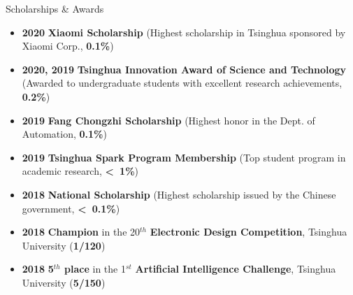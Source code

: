 \documentclass{resume} %
\begin{document}
\begin{rSection}{Scholarships \& Awards}
\begin{spacing}{1.05}
\begin{itemize}
    \item \textbf{2020} \textbf{Xiaomi Scholarship} (Highest scholarship in Tsinghua sponsored by Xiaomi Corp., \textbf{0.1\%})
    \item \textbf{2020, 2019} \textbf{Tsinghua Innovation Award of Science and Technology} (Awarded to undergraduate students with excellent research achievements, \textbf{0.2\%})
    \item \textbf{2019} \textbf{Fang Chongzhi Scholarship} (Highest honor in the Dept. of Automation, \textbf{0.1\%})
    \item \textbf{2019} \textbf{Tsinghua Spark Program Membership} (Top student program in academic research, \textbf{\textless~1\%})
    \item \textbf{2018} \textbf{National Scholarship} (Highest scholarship issued by the Chinese government, \textbf{\textless~0.1\%})
    \item \textbf{2018} \textbf{Champion} in the 20$^{th}$ \textbf{Electronic Design Competition}, Tsinghua University (\textbf{1/120})%
    \item \textbf{2018} \textbf{5$^{th}$ place} in the 1$^{st}$ \textbf{Artificial Intelligence Challenge}, Tsinghua University (\textbf{5/150})%
\end{itemize}
\end{spacing}

\end{rSection}
\end{document}
